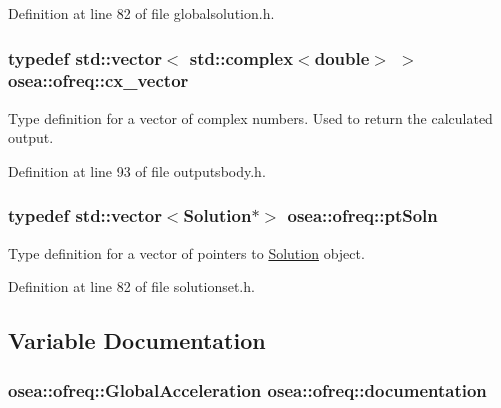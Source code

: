 Definition at line 82 of file globalsolution.\-h.

\hypertarget{namespaceosea_1_1ofreq_a42bf1d8bbba99693142c4184486ad3e0}{
\subsubsection[{cx\-\_\-vector}]{\setlength{\rightskip}{0pt plus 5cm}typedef std\-::vector$<$ std\-::complex$<$double$>$ $>$ {\bf osea\-::ofreq\-::cx\-\_\-vector}}}\label{namespaceosea_1_1ofreq_a42bf1d8bbba99693142c4184486ad3e0}


Type definition for a vector of complex numbers. Used to return the calculated output. 



Definition at line 93 of file outputsbody.\-h.

\hypertarget{namespaceosea_1_1ofreq_a951464fca478bccfc9e5295910e5eec3}{
\subsubsection[{pt\-Soln}]{\setlength{\rightskip}{0pt plus 5cm}typedef std\-::vector$<${\bf Solution}$\ast$$>$ {\bf osea\-::ofreq\-::pt\-Soln}}}\label{namespaceosea_1_1ofreq_a951464fca478bccfc9e5295910e5eec3}
Type definition for a vector of pointers to \hyperlink{classosea_1_1ofreq_1_1_solution}{Solution} object. 

Definition at line 82 of file solutionset.\-h.



\subsection{Variable Documentation}
\hypertarget{namespaceosea_1_1ofreq_a0abf1323420ab8be986df47ea56c3948}{
\subsubsection[{documentation}]{\setlength{\rightskip}{0pt plus 5cm} {\bf osea\-::ofreq\-::\-Global\-Acceleration} osea\-::ofreq\-::documentation}}\label{namespaceosea_1_1ofreq_a0abf1323420ab8be986df47ea56c3948}
